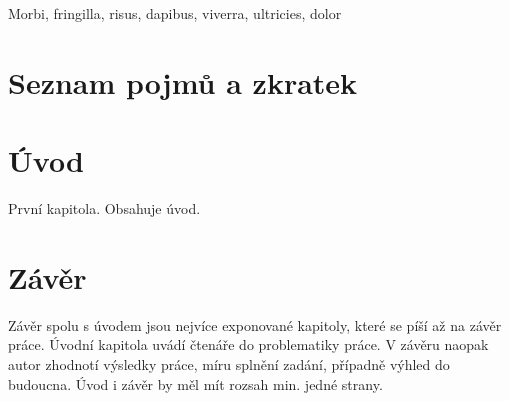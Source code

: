 \documentclass[11pt,a4paper,fleqn,titlepage,twoside,openany]{book}
\begin{document}
Morbi, fringilla, risus, dapibus, viverra, ultricies, dolor

\tableofcontents

\let\cleardoublepage\clearpage %

\chapter*{Seznam pojmů a zkratek}

\printglossary[title=Slovník pojmů]

\printglossary[type=acronym, title=Slovník zkratek]

\listoffigures
{} 

\thispagestyle{empty}

\chapter {Úvod}
První kapitola. Obsahuje úvod.




\chapter{Závěr}

Závěr spolu s úvodem jsou nejvíce exponované kapitoly, které se píší až na závěr práce. Úvodní kapitola uvádí čtenáře do problematiky práce. V závěru naopak autor zhodnotí výsledky práce, míru splnění zadání, případně výhled do budoucna. Úvod i závěr by měl mít rozsah min. jedné strany.
\end{document}
